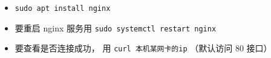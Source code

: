
\begin{issues}
\issueDraft
\end{issues}

\begin{itemize}
\item \verb|sudo apt install nginx|
\item 要重启 nginx 服务用 \verb|sudo systemctl restart nginx|
\item 要查看是否连接成功， 用 \verb|curl 本机某网卡的ip| （默认访问 80 接口）
\end{itemize}

